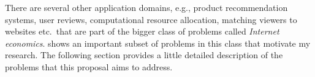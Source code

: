 \documentclass[10pt,psfig,letter]{article}
\begin{document}
\begin{figure}[h!]
\centering
\end{figure}

There are several other application domains, e.g., product recommendation systems, user reviews, computational resource allocation, matching viewers to websites etc.\ that are part of the bigger class of problems called {\em Internet economics}.  shows an important subset of problems in this class that motivate my research. The following section provides a little detailed description of the problems that this proposal aims to address.
\end{document}
